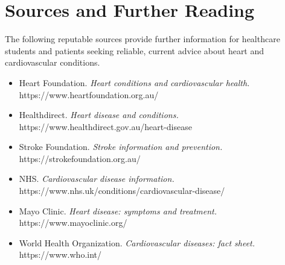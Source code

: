 \section*{Sources and Further Reading}
The following reputable sources provide further information for healthcare students and patients seeking reliable, current advice about heart and cardiovascular conditions.

\begin{itemize}
    \item Heart Foundation. \textit{Heart conditions and cardiovascular health.} https://www.heartfoundation.org.au/
    \item Healthdirect. \textit{Heart disease and conditions.} https://www.healthdirect.gov.au/heart-disease
    \item Stroke Foundation. \textit{Stroke information and prevention.} https://strokefoundation.org.au/
    \item NHS. \textit{Cardiovascular disease information.} https://www.nhs.uk/conditions/cardiovascular-disease/
    \item Mayo Clinic. \textit{Heart disease: symptoms and treatment.} https://www.mayoclinic.org/
    \item World Health Organization. \textit{Cardiovascular diseases: fact sheet.} https://www.who.int/
\end{itemize}
